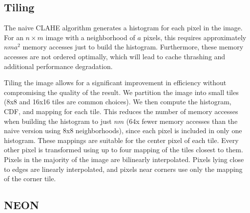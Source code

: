 \documentclass[10pt,twocolumn,letterpaper]{article}
\begin{document}
\subsection{Tiling}

The naive CLAHE algorithm generates a histogram for each pixel in the image. For an $n \times m$ image with a neighborhood of $a$ pixels, this requires approximately $nma^2$ memory accesses just to build the histogram. Furthermore, these memory accesses are not ordered optimally, which will lead to cache thrashing and additional performance degradation.

Tiling the image allows for a significant improvement in efficiency without compromising the quality of the result. We partition the image into small tiles (8x8 and 16x16 tiles are common choices). We then compute the histogram, CDF, and mapping for each tile. This reduces the number of memory accesses when building the histogram to just $nm$ (64x fewer memory accesses than the naive version using 8x8 neighborhoods), since each pixel is included in only one histogram. These mappings are suitable for the center pixel of each tile. Every other pixel is transformed using up to four mapping of the tiles closest to them. Pixels in the majority of the image are bilinearly interpolated. Pixels lying close to edges are linearly interpolated, and pixels near corners use only the mapping of the corner tile.

\subsection{NEON}
\end{document}
